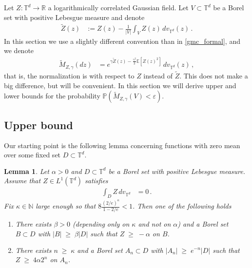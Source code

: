 \documentclass[11pt]{article}
\numberwithin{equation}{section}
\newtheorem{lemma}[theorem]{Lemma}
\theoremstyle{definition}
\renewcommand{\tilde}{\widetilde}          %
\renewcommand{\geq}{\;\geqslant\;}                   %
\newcommand{\R}{\mathbb{R}}
\newcommand{\N}{\mathbb{N}}
\newcommand{\E}{\mathbb{E}}
\renewcommand{\P}{\mathbb{P}}
\def\eps{\varepsilon}
\def\T{\mathbb{T}}
\newcommand{\ab}{|}
\newcommand{\grea}{>}
\begin{document}
\noindent Let $Z: \T^d \to \R$ a logarithmically correlated Gaussian field. Let $V \subset \T^d$ be a Borel set with positive Lebesgue measure and denote
\begin{align}\label{eq_Z_tilde}
\tilde Z(z) &:= Z(z) - \frac{1}{|V|} \int_{V} Z(z) \, dv_{\T^d}(z)\,.
\end{align}
In this section we use a slightly different convention than in \eqref{gmc_formal}, and we denote
\begin{align}\label{eq_M_tilde}
\tilde M_{Z,\gamma} (dz) &= e^{\gamma \tilde Z(z) - \frac{\gamma^2}{2} \E[ Z(z)^2]} \, dv_{\T^d}(z) \,,
\end{align}
that is, the normalization is with respect to $Z$ instead of $\tilde Z$. This does not make a big difference, but will be convenient. In this section we will derive upper and lower bounds for the probability $\P ( \tilde M_{Z,\gamma}(V) < \eps )$.

\subsection{Upper bound}

Our starting point is the following lemma concerning functions with zero mean over some fixed set $D \subset \T^d$.


\begin{lemma}\label{ck}
Let $\alpha \grea 0$ and $D \subset \T^d$ be a Borel set with positive Lebesgue measure. Assume that $Z \in L^1(\T^d)$ satisfies 
\begin{align*}
\int_D Z \, dv_{\T^d} &= 0\,.
\end{align*}
Fix $\kappa \in \N$ large enough so that $ 8 \frac{ (2/e)^\kappa}{1-2/e} \less 1$.
Then one of the following holds
\begin{enumerate}
\item There exists $\beta \grea 0$ (depending only on $\kappa$ and not on $\alpha$) and a Borel set $B \subset D$ with $\ab B \ab \geq \beta \ab D \ab$ such that $Z \geq -\alpha$ on $B$.
\item There exists $n \geq \kappa$ and a Borel set $A_n \subset D$ with $\ab A_n \ab \geq e^{-n} \ab D \ab$ such that $Z \geq 4 \alpha 2^n $ on $A_n$.
\end{enumerate}
\end{lemma}
\end{document}
